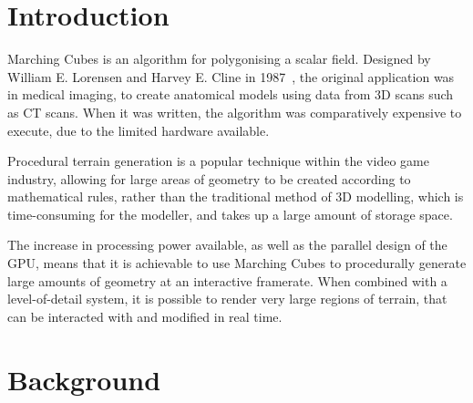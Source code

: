 \documentclass[11pt]{article}
\begin{document}
\tableofcontents

\newpage
\section{Introduction} 

Marching Cubes is an algorithm for polygonising a scalar field. Designed by William E. Lorensen and Harvey E. Cline in 1987~\cite{10.1145/37402.37422}, the original application was in medical imaging, to create anatomical models using data from 3D scans such as CT scans. When it was written, the algorithm was comparatively expensive to execute, due to the limited hardware available. 

Procedural terrain generation is a popular technique within the video game industry, allowing for large areas of geometry to be created according to mathematical rules, rather than the traditional method of 3D modelling, which is time-consuming for the modeller, and takes up a large amount of storage space.

The increase in processing power available, as well as the parallel design of the GPU, means that it is achievable to use Marching Cubes to procedurally generate large amounts of geometry at an interactive framerate. When combined with a level-of-detail system, it is possible to render very large regions of terrain, that can be interacted with and modified in real time.

\section{Background}
\end{document}
